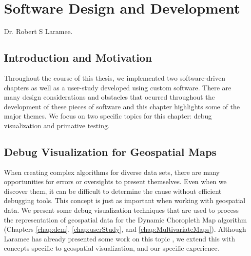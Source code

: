 \chapter{Software Design and Development}
\label{chap:softdev}

{Dr. Robert S Laramee.}

\newpage
{\footnotesize \hypersetup{linkcolor=black}
\minitoc}

\section{Introduction and Motivation}
Throughout the course of this thesis, we implemented two software-driven chapters as well as a user-study developed using custom software. There are many design considerations and obstacles that ocurred throughout the development of these pieces of software and this chapter highlights some of the major themes. We focus on two specific topics for this chapter: debug visualization and primative testing.
\section{Debug Visualization for Geospatial Maps}
When creating complex algorithms for diverse data sets, there are many opportunities for errors or oversights to present themselves. Even when we discover them, it can be difficult to determine the cause without efficient debugging tools. This concept is just as important when working with geospatial data.
We present some debug visualization techniques that are used to process the representation of geospatial data for the Dynamic Choropleth Map algorithm (Chapters \ref{chap:dcm}, \ref{chap:userStudy}, and \ref{chap:MultivariateMaps}). Although Laramee has already presented some work on this topic \cite{laramee2009using}, we extend this with concepts specific to geospatial visualization, and our specific experience.
